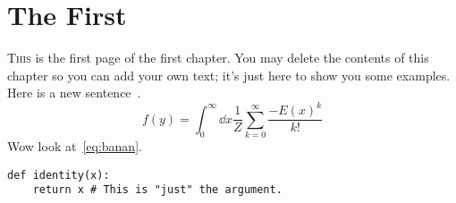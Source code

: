 \documentclass[thesis.tex]{subfiles}
\begin{document}
\chapter{The First}

\lettrine{T}{his} is the first page of the first chapter. You may delete the
contents of this chapter so you can add your own text; it's just here to show
you some examples. Here is a new sentence~\cite{russ:1995}.
\begin{equation}
  f(y)
  = \int_0^\infty \dd{x}\frac{1}{Z}\sum_{k=0}^\infty \frac{-{E(x)}^k}{k!}
  \label{eq:banan}
\end{equation}
Wow look at~\cref{eq:banan}.
\begin{verbatim}
def identity(x):
    return x # This is "just" the argument.
\end{verbatim}
\kant%
\end{document}
